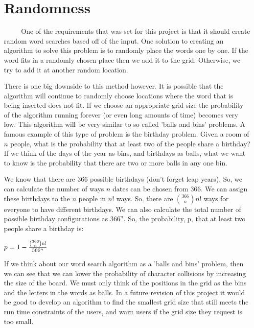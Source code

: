 \documentclass[12pt]{report}   %
\begin{document}
\section*{Randomness}
    \ \ \ \ \ One of the requirements that was set for this project is that it
    should create random word searches based off of the input. One solution to
    creating an algorithm to solve this problem is to randomly place the words
    one by one. If the word fits in a randomly chosen place then we add it to
    the grid. Otherwise, we try to add it at another random location.

    \vspace{12pt}

    There is one big downside to this method however. It is possible that the
    algorithm will continue to randomly choose locations where the word that is
    being inserted does not fit. If we choose an appropriate grid size the
    probability of the algorithm running forever (or even long amounts of time)
    becomes very low. This algorithm will be very similar to so called 'balls
    and bins' problems. A famous example of this type of problem is the
    birthday problem. Given a room of $n$ people, what is the probability that
    at least two of the people share a birthday? If we think of the days of the
    year as bins, and birthdays as balls, what we want to know is the
    probability that there are two or more balls in any one bin.

    \vspace{12pt}

    We know that there are 366 possible birthdays (don't forget leap years). 
    So, we can calculate the number of ways $n$ dates can be chosen from 366.
    We can assign these birthdays to the $n$ people in $n!$ ways. So, there
    are $ {{366} \choose {n}} n!$ ways for everyone to have different birthdays.
    We can also calculate the total number of possible birthday configurations
    as $366^{n}$. So, the probability, p, that at least two people share a
    birthday is:

    \vspace{12pt}
    \begin{center}
        $ p = 1 - {{{366 \choose n} n!} \over {366^{n}}} $
    \end{center}

    \vspace{12pt}

    If we think about our word search algorithm as a 'balls and bins' problem,
    then we can see that we can lower the probability of character collisions
    by increasing the size of the board. We must only think of the positions in
    the grid as the bins and the letters in the words as balls. In a future
    revision of this project it would be good to develop an algorithm to find
    the smallest grid size that still meets the run time constraints of the
    users, and warn users if the grid size they request is too small.
    \cite{prob}
\end{document}
